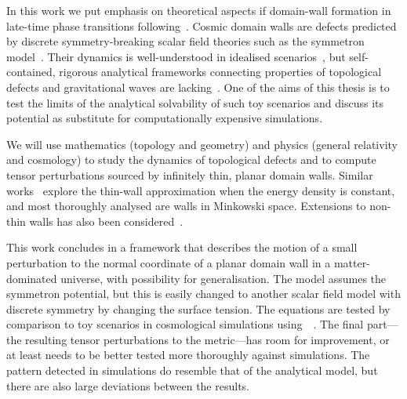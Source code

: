 In this work we put emphasis on theoretical aspects if domain-wall formation in late-time phase transitions following~\citet{christiansenGravitationalWavesDark2024,christiansenAsimulationDomainFormation2024}. Cosmic domain walls are defects predicted by discrete symmetry-breaking scalar field theories such as the symmetron model~\citep{hinterbichlerSymmetronCosmology2011}. Their dynamics is well-understood in idealised scenarios~\citep{vachaspatiKinksDomainWalls2006,blanco-pilladoDynamicsDomainWall2023,guvenPerturbationsTopologicalDefect1993,garrigaPerturbationsDomainWalls1991,ishibashiEquationMotionDomain1999}, but self-contained, rigorous analytical frameworks connecting properties of topological defects and gravitational waves are lacking~\citep{saikawaReviewGravitationalWaves2017}. One of the aims of this thesis is to test the limits of the analytical solvability of such toy scenarios and discuss its potential as substitute for computationally expensive simulations. 








We will use mathematics (topology and geometry) and physics (general relativity and cosmology) to study the dynamics of topological defects and to compute tensor perturbations sourced by infinitely thin, planar domain walls. 
Similar works~\cite{blanco-pilladoDynamicsDomainWall2023,ishibashiEquationMotionDomain1999,garrigaPerturbationsDomainWalls1991} explore the thin-wall approximation when the energy density is constant, and most thoroughly analysed are walls in Minkowski space. Extensions to non-thin walls has also been considered~\citep{cuttingGravitationalWavesVacuum2021}. %


This work concludes in a framework that describes the motion of a small perturbation to the normal coordinate of a planar domain wall in a matter-dominated universe, with possibility for generalisation. The model assumes the symmetron potential, but this is easily changed to another scalar field model with discrete symmetry by changing the surface tension. The equations are tested by comparison to toy scenarios in cosmological simulations using~\gevolution~\citep{adamekGevolutionCosmologicalNbody2016}. 
The final part---the resulting tensor perturbations to the metric---has room for improvement, or at least needs to be better tested more thoroughly against simulations. The pattern detected in simulations do resemble that of the analytical model, but there are also large deviations between the results.


